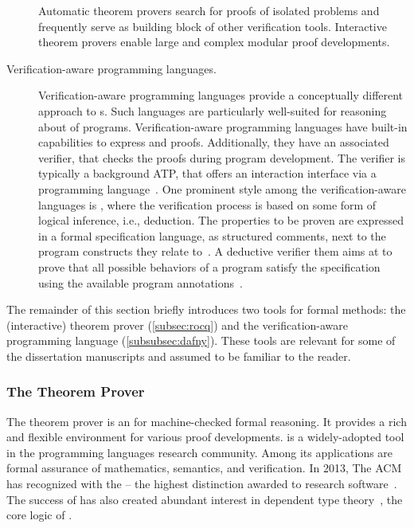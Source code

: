 \begin{description}
Automatic theorem provers search for proofs of
isolated problems and frequently serve as building block of other verification
tools. Interactive theorem provers enable
large and complex modular proof developments.

\item[Verification-aware programming languages.]
Verification-aware programming languages provide a conceptually different
approach to s. Such languages are particularly well-suited
for reasoning about  of programs. Verification-aware
programming languages have built-in capabilities to express 
and proofs. Additionally, they have an associated verifier, that checks the
proofs during program development. The verifier is typically a background ATP,
that offers an interaction interface via a programming
language~\cite{leino2023}. One prominent style among the verification-aware
languages is \emph{}, where the verification process
is based on some form of logical inference, i.e., deduction. The properties to
be proven are expressed in a formal specification language, as structured
comments, next to the program constructs they relate to~\cite{hahnle2019}. A
deductive verifier them aims at to prove that all possible behaviors of a
program satisfy the specification using the available program
annotations~\cite{cassez2022}.
\end{description}

The remainder of this section briefly introduces two tools for formal methods:
the (interactive)  theorem prover (\autoref{subsec:rocq}) and the
verification-aware programming language  (\autoref{subsubsec:dafny}).
These tools are relevant for some of the dissertation manuscripts and assumed to
be familiar to the reader.

\subsubsection{The  Theorem Prover}
\label{subsec:rocq}

The  theorem prover is an  for
machine-checked formal reasoning. It provides a rich and flexible environment
for various proof developments.  is a widely-adopted tool in the
programming languages research community. Among its applications are formal
assurance of mathematics, semantics, and verification. In 2013, The ACM has
recognized  with the
\href{https://awards.acm.org/software-system}{} --
the highest distinction awarded to research software~\cite{rocq-community}. The
success of  has also created abundant interest in dependent type
theory~\cite{coquand1988}, \ie the core logic of
.

